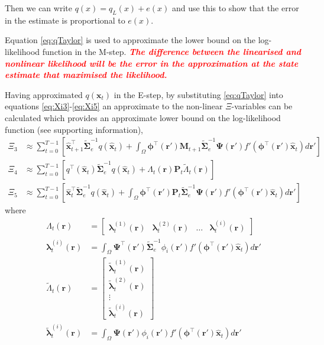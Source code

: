 \documentclass[]{article}
\newcommand{\dean}[1]{\textsf{\emph{\textbf{\textcolor{red}{#1}}}}}
\begin{document}
Then we can write $q(x) = q_L(x) + e(x)$ and use this to show that the error in the estimate is proportional to $e(x)$.

Equation \ref{eq:qTaylor} is used to approximate the lower bound on the log-likelihood function in the M-step. \dean{The difference between the linearised and nonlinear likelihood will be the error in the approximation at the state estimate that maximised the likelihood.}

Having approximated $q\left(\mathbf x_t\right)$ in the E-step, by substituting  \ref{eq:qTaylor} into equations \ref{eq:Xi3}-\ref{eq:Xi5} an approximate to the non-linear $\Xi$-variables can be calculated which provides an approximate lower bound on the log-likelihood function (see supporting information), 
\begin{align}
\Xi_{3}&\approx\sum_{t=0}^{T-1}\left[ \mathbf{\hat x}_{t+1}^\top\tilde{\boldsymbol\Sigma}_e^{-1}q(\mathbf{\hat x}_t)+\int_\Omega\boldsymbol \phi^\top(\mathbf r') \mathbf M_{t+1} \tilde{\boldsymbol\Sigma}_e^{-1} \boldsymbol{\Psi}(\mathbf{r}') f'(\boldsymbol \phi^\top(\mathbf r')\mathbf {\hat x}_t) d\mathbf{r}'\right] \\	
\Xi_{4}&\approx\sum_{t=0}^{T-1}\left[q^\top(\mathbf{\hat x}_t)\tilde{\boldsymbol\Sigma}_e^{-1}q(\mathbf{\hat x}_t)+\Lambda_t(\mathbf r)\mathbf P_t \tilde{\Lambda}_t(\mathbf r)\right] \\
 \Xi_{5}&\approx\sum_{t=0}^{T-1}\left[ \mathbf{\hat x}_{t}^\top\tilde{\boldsymbol\Sigma}_e^{-1}q(\mathbf{\hat x}_t)+\int_\Omega\boldsymbol \phi^\top(\mathbf r') \mathbf P_t \tilde{\boldsymbol\Sigma}_e^{-1}  \boldsymbol{\Psi}(\mathbf{r}') f'(\boldsymbol \phi^\top(\mathbf r')\mathbf {\hat x}_t) d\mathbf{r}'\right] 
 \end{align}
where
\begin{align}
	 \Lambda_t(\mathbf r)&=\begin{bmatrix}\boldsymbol \lambda_t^{(1)}(\mathbf r) & \boldsymbol \lambda_t^{(2)}(\mathbf r)& \dots &\boldsymbol \lambda_t^{(i)}(\mathbf r)\end{bmatrix} \label{eq:Lambda}\\
	 \boldsymbol\lambda_t^{(i)}(\mathbf r)&=\int_{\Omega} \boldsymbol \Psi^\top(\mathbf r')\tilde{\boldsymbol\Sigma}_e^{-1}\phi_i(\mathbf r')f'(\boldsymbol\phi^\top(\mathbf r')\mathbf {\hat x}_t)d\mathbf r'\label{eq:lambdai}\\
	\tilde{\Lambda}_t(\mathbf r)&=\begin{bmatrix}\tilde{\boldsymbol \lambda}_t^{(1)}(\mathbf r) \\ \tilde{\boldsymbol \lambda}_t^{(2)}(\mathbf r) \\ \vdots \\ \tilde{\boldsymbol \lambda}_t^{(i)}(\mathbf r)\end{bmatrix} \label{eq:Lambdatilde}\\
	 \tilde{\boldsymbol \lambda}_t^{(i)}(\mathbf r)&=\int_{\Omega} \boldsymbol \Psi(\mathbf r')\phi_i(\mathbf r')f'(\boldsymbol\phi^\top(\mathbf r')\mathbf {\hat x}_t)d\mathbf r' \label{eq:lambdatildei}
\end{align}
\end{document}
